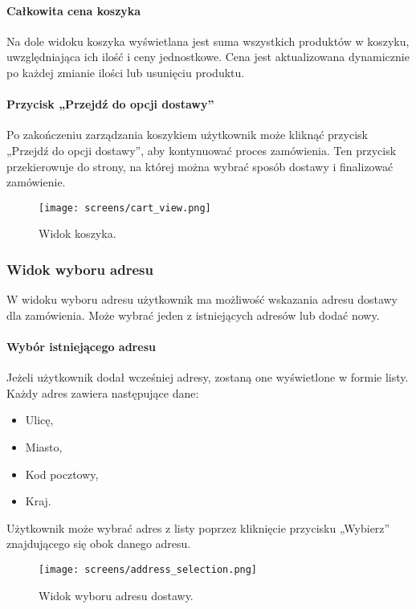 \documentclass[12pt,a4paper,oneside]{article}
\theoremstyle{definition}
\numberwithin{equation}{section}
\begin{document}
\paragraph{Całkowita cena koszyka}
Na dole widoku koszyka wyświetlana jest suma wszystkich produktów w koszyku, uwzględniająca ich ilość i ceny jednostkowe. Cena jest aktualizowana dynamicznie po każdej zmianie ilości lub usunięciu produktu.

\paragraph{Przycisk „Przejdź do opcji dostawy”}
Po zakończeniu zarządzania koszykiem użytkownik może kliknąć przycisk „Przejdź do opcji dostawy”, aby kontynuować proces zamówienia. Ten przycisk przekierowuje do strony, na której można wybrać sposób dostawy i finalizować zamówienie.

\begin{figure}[H]
    \centering
    \texttt{[image: screens/cart\_view.png]}
    \caption{Widok koszyka.}
    \label{fig:cart_view}
\end{figure}





\newpage
\subsubsection{Widok wyboru adresu}
W widoku wyboru adresu użytkownik ma możliwość wskazania adresu dostawy dla zamówienia. Może wybrać jeden z istniejących adresów lub dodać nowy.

\paragraph{Wybór istniejącego adresu}
Jeżeli użytkownik dodał wcześniej adresy, zostaną one wyświetlone w formie listy. Każdy adres zawiera następujące dane:
\begin{itemize}
    \item Ulicę,
    \item Miasto,
    \item Kod pocztowy,
    \item Kraj.
\end{itemize}
Użytkownik może wybrać adres z listy poprzez kliknięcie przycisku „Wybierz” znajdującego się obok danego adresu.
\begin{figure}[H]
    \centering
    \texttt{[image: screens/address\_selection.png]}
    \caption{Widok wyboru adresu dostawy.}
    \label{fig:address_selection}
\end{figure}
\end{document}
